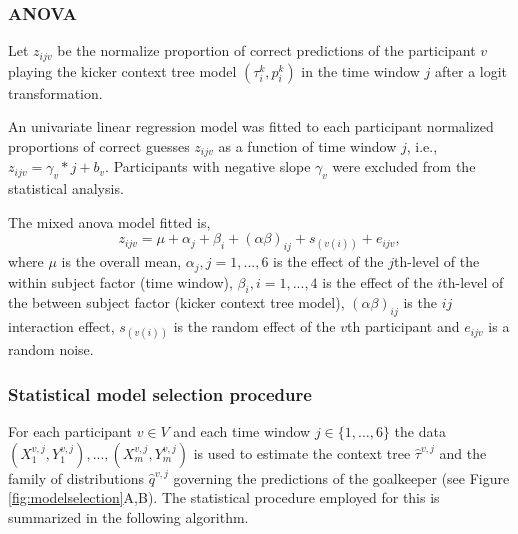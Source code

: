\documentclass[fleqn,10pt]{wlscirep}
\begin{document}
\subsubsection*{ANOVA}

Let $z_{ijv}$ be the normalize proportion of correct predictions of the participant $v$ playing the kicker context tree model  $(\tau_i^k, p_i^k)$ in the time window $j$ after a logit transformation. 

An univariate linear regression model was fitted to each participant normalized proportions of correct guesses $z_{ijv}$ as a function of time window $j$, i.e., $z_{ijv} = \gamma_{v}*j + b_v$. Participants with negative slope $\gamma_{v}$ were excluded from the statistical analysis. 

The mixed anova model fitted is,
\begin{equation}
	z_{ijv} = \mu + \alpha_j + \beta_i + (\alpha\beta)_{ij} + s_{(v(i))} + e_{ijv},
\end{equation}
where $\mu$ is the overall mean, $\alpha_j, j=1,...,6$ is the effect of the $j$th-level of the within subject factor (time window), $\beta_i, i=1,...,4$ is the effect of the $i$th-level of the between subject factor (kicker context tree model), $(\alpha\beta)_{ij}$ is the $ij$ interaction effect, $s_{(v(i))}$ is the random effect of the $v$th participant and $e_{ijv}$ is a random noise.


\subsubsection*{Statistical model selection procedure}

For each participant $v \in V$ and each time window $j \in \{1,...,6\}$ the data $(X_1^{v,j}, Y_1^{v,j}),...,(X_m^{v,j}, Y_m^{v,j})$ is used to estimate the context tree $\hat{\tau}^{v,j}$ and the family of distributions $\hat{q}^{v,j}$ governing the predictions of the goalkeeper (see Figure \ref{fig:modelselection}A,B). The statistical procedure employed for this is summarized in the following algorithm.
\end{document}
